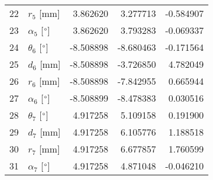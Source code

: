 \documentclass{standalone}%
\begin{document}
\begin{tabular}{llrrr}
22 &              $r_{5}$ [mm] &  3.862620 &   3.277713 &  -0.584907 \\
23 &  $\alpha_{5}$ [$\degree$] &  3.862620 &   3.793283 &  -0.069337 \\
24 &  $\theta_{6}$ [$\degree$] & -8.508898 &  -8.680463 &  -0.171564 \\
25 &              $d_{6}$ [mm] & -8.508898 &  -3.726850 &   4.782049 \\
26 &              $r_{6}$ [mm] & -8.508898 &  -7.842955 &   0.665944 \\
27 &  $\alpha_{6}$ [$\degree$] & -8.508899 &  -8.478383 &   0.030516 \\
28 &  $\theta_{7}$ [$\degree$] &  4.917258 &   5.109158 &   0.191900 \\
29 &              $d_{7}$ [mm] &  4.917258 &   6.105776 &   1.188518 \\
30 &              $r_{7}$ [mm] &  4.917258 &   6.677857 &   1.760599 \\
31 &  $\alpha_{7}$ [$\degree$] &  4.917258 &   4.871048 &  -0.046210 \\
\bottomrule
\end{tabular}
%
\end{document}
